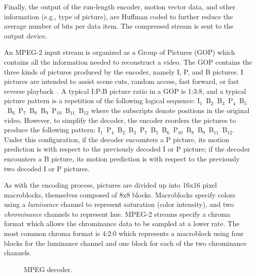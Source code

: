 Finally, the output of the run-length encoder, motion vector data,
and other information (e.g., type of picture), are Huffman coded to 
further reduce the average number of bits per data item. The compressed
stream is sent to the output device.


An MPEG-2 input stream is organized as a Group of Pictures (GOP) which
contains all the information needed to reconstruct a video. The GOP
contains the three kinds of pictures produced by the encoder, namely
I, P, and B pictures. I pictures are intended to assist scene cuts,
random access, fast forward, or fast reverse
playback~\cite[p. 14]{MPEG2}. A typical I:P:B picture ratio in a GOP
is 1:3:8, and a typical picture pattern is a repetition of the
following logical sequence:
I$_1$~B$_2$~B$_3$~P$_4$~B$_5$~B$_6$~P$_7$~B$_8$~B$_9$~P$_{10}$~B$_{11}$~B$_{12}$
where the subscripts denote positions in the original video.  However,
to simplify the decoder, the encoder reorders the pictures to produce
the following pattern:
I$_1$~P$_4$~B$_2$~B$_3$~P$_7$~B$_5$~B$_6$~P$_{10}$~B$_8$~B$_9$~B$_{11}$~B$_{12}$.
Under this configuration, if the decoder encounters a P picture, its
motion prediction is with respect to the previously decoded I or P
picture; if the decoder encounters a B picture, its motion prediction
is with respect to the previously two decoded I or P pictures.

As with the encoding process, pictures are divided up into 16x16 pixel
macroblocks, themselves composed of 8x8 blocks. Macroblocks
specify colors using a {\it luminance} channel to represent saturation
(color intensity), and two {\it chrominance} channels to represent
hue. MPEG-2 streams specify a chroma format which allows the
chrominance data to be sampled at a lower rate. The most common chroma 
format is 4:2:0 which represents a macroblock using four blocks for the
luminance channel and one block for each of the two chrominance
channels. 

\begin{figure}[t]
\begin{center}
\vspace{-12pt}
 \caption{MPEG decoder.}
 \label{fig:mpeg-decoder}
\end{center}
\end{figure}

